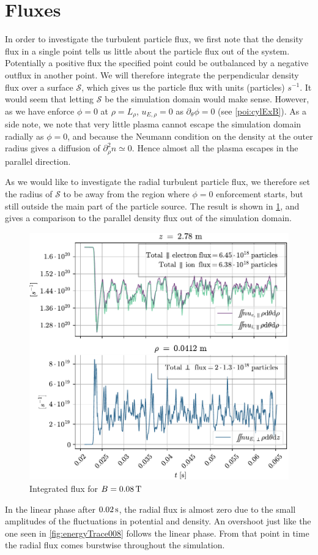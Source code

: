 \section{Fluxes}
\label{sec:fluxes}
%
In order to investigate the turbulent particle flux, we first note that the density flux in a single point tells us little about the particle flux out of the system.
Potentially a positive flux the specified point could be outbalanced by a negative outflux in another point.
We will therefore integrate the perpendicular density flux over a surface $\mathcal{S}$, which gives us the particle flux with units (particles) $s^{-1}$.
It would seem that letting $\mathcal{S}$ be the simulation domain would make sense.
However, as we have enforce $\phi=0$ at $\rho=L_\rho$, $u_{E,\rho}=0$ as $\partial_\theta \phi=0$ (see \cref{poi:cylExB}).
As a side note, we note that very little plasma cannot escape the simulation domain radially as $\phi=0$, and because the Neumann condition on the density at the outer radius gives a diffusion of $\partial_\rho^2 n \simeq 0$.
Hence almost all the plasma escapes in the parallel direction.

As we would like to investigate the radial turbulent particle flux, we therefore set the radius of $\mathcal{S}$ to be away from the region where $\phi=0$ enforcement starts, but still outside the main part of the particle source.
The result is shown in \cref{fig:flux0008}, and gives a comparison to the parallel density flux out of the simulation domain.
%
\begin{figure}[htb]
    \centering
    \includegraphics{fig/results/totalFlux/flux0008}
    \caption{Integrated flux for $B=0.08\, \text{T}$}
    \label{fig:flux0008}
\end{figure}
%
In the linear phase after $0.02\, \text{s}$, the radial flux is almost zero due to the small amplitudes of the fluctuations in potential and density.
An overshoot just like the one seen in \cref{fig:energyTrace008} follows the linear phase.
From that point in time the radial flux comes burstwise throughout the simulation.

